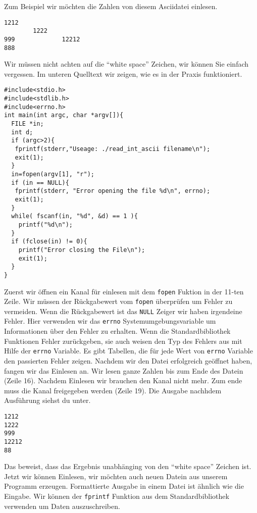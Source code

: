 Zum Beispiel wir möchten die Zahlen von diesem Asciidatei einlesen.
\begin{lstlisting}
1212
        1222
999             12212
888
\end{lstlisting}
Wir müssen nicht achten auf die ``white space'' Zeichen, wir können Sie einfach vergessen.
Im unteren Quelltext wir zeigen, wie es in der Praxis funktioniert.
\begin{lstlisting}
#include<stdio.h>
#include<stdlib.h>
#include<errno.h>
int main(int argc, char *argv[]){
  FILE *in;
  int d;
  if (argc>2){
   fprintf(stderr,"Useage: ./read_int_ascii filename\n");
   exit(1);
  }
  in=fopen(argv[1], "r");
  if (in == NULL){
   fprintf(stderr, "Error opening the file %d\n", errno);
   exit(1);
  }
  while( fscanf(in, "%d", &d) == 1 ){
    printf("%d\n");
  }
  if (fclose(in) != 0){
    printf("Error closing the File\n");
    exit(1);
  }
}
\end{lstlisting}
Zuerst wir öffnen ein Kanal für einlesen mit dem \texttt{fopen} Fuktion in der 11-ten Zeile. Wir müssen 
der Rückgabewert vom \texttt{fopen} überprüfen um Fehler zu vermeiden. Wenn die Rückgabewert ist das 
\texttt{NULL} Zeiger wir haben irgendeine Fehler. Hier verwenden wir das \texttt{errno} Systemumgebungsvariable
um Informationen über den Fehler zu erhalten. Wenn die Standardbibliothek Funktionen Fehler zurückgeben, sie auch 
weisen den Typ des Fehlers aus mit Hilfe der \texttt{errno} Variable. Es gibt Tabellen, die für jede Wert von 
\texttt{errno} Variable den passierten Fehler zeigen. Nachdem wir den Datei erfolgreich geöffnet haben, fangen wir 
das Einlesen an. Wir lesen ganze Zahlen bis zum Ende des Datein (Zeile 16). Nachdem Einlesen wir brauchen den Kanal 
nicht mehr. Zum ende muss die Kanal freigegeben werden (Zeile 19). Die Ausgabe nachhdem Ausführung siehst du unter.
\begin{lstlisting}
1212
1222
999
12212
88
\end{lstlisting}
Das beweist, dass das Ergebnis unabhänging von den ``white space'' Zeichen ist. Jetzt wir können Einlesen, 
wir möchten auch neuen Datein aus unserem Programm erzeugen. Formattierte Ausgabe in einem Datei ist ähnlich 
wie die Eingabe. Wir können der \texttt{fprintf} Funktion aus dem Standardbibliothek verwenden um Daten 
auszuschreiben.
